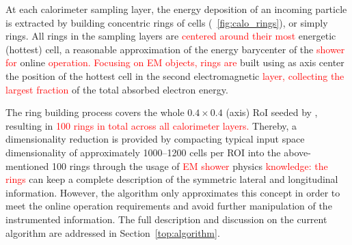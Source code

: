 At each calorimeter sampling layer, the energy deposition of an incoming particle is extracted by building concentric rings of cells (\figurename~\ref{fig:calo_rings}), or simply rings. All rings in the \ecal sampling layers are
\textcolor{red}{centered around their most} energetic (hottest) cell, a reasonable
approximation of the energy barycenter of the \textcolor{red}{shower for} online
\textcolor{red}{operation. Focusing on EM objects, rings are} built using as axis center the position of the hottest cell in the second electromagnetic \textcolor{red}{layer, collecting the largest fraction} of the total absorbed electron energy.

The ring building process covers the whole $0.4\times0.4$ (\etaphi axis) RoI
seeded by \licalo, resulting in \textcolor{red}{100 rings in total across all calorimeter layers.}
Thereby, a dimensionality reduction is provided by compacting
typical input space dimensionality of approximately 1000--1200 cells per ROI into
the above-mentioned 100 rings through the usage of \textcolor{red}{EM shower} physics \textcolor{red}{knowledge: the rings} can keep a complete description of the symmetric lateral and
longitudinal information. However, the algorithm only approximates this concept
in order to meet the online operation requirements and avoid further
manipulation of the instrumented information. The full description and
discussion on the current algorithm are addressed in
Section~\ref{top:algorithm}.



